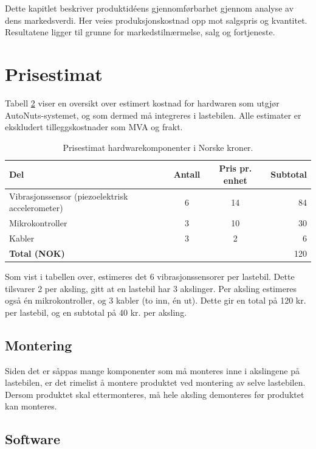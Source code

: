 Dette kapitlet beskriver produktidéens gjennomførbarhet gjennom analyse av 
dens markedsverdi. Her veies produksjonskostnad opp mot salgspris og kvantitet.
Resultatene ligger til grunne for markedstilnærmelse, salg og fortjeneste.

\section{Prisestimat}
Tabell \ref{tab:price-HW} viser en oversikt over estimert kostnad for 
hardwaren som utgjør AutoNuts-systemet, og som dermed må integreres i lastebilen. Alle estimater er ekskludert tilleggskostnader som MVA og frakt.

\begin{table}[H]
\caption{Prisestimat hardwarekomponenter i Norske kroner.}
\newline
\begin{table}[H]
\caption{Prisestimat hardwarekomponenter i Norske kroner.}
\label{tab:price-HW}
\begin{tabularx}{\textwidth}{lcc|r}
	{\bf Del} & {\bf Antall} & {\bf Pris pr. enhet} & {\bf Subtotal}\\
	\hline
	Vibrasjonssensor (piezoelektrisk accelerometer) & 6 & 14 & 84\\
	Mikrokontroller & 3 & 10 & 30\\
	Kabler & 3 & 2 & 6\\
	\hline
	\multicolumn{3}{l}{{\bf Total (NOK)}} &\multicolumn{1}{r}{120}\\
	\hline \hline
\end{tabularx}
\end{table}

Som vist i tabellen over, estimeres det 6 vibrasjonssensorer per lastebil. Dette
tilsvarer 2 per aksling, gitt at en lastebil har 3 akslinger. Per aksling 
estimeres også én mikrokontroller, og 3 kabler (to inn, én ut). Dette gir en 
total på 120 kr. per lastebil, og en subtotal på 40 kr. per aksling.

\subsection{Montering}
Siden det er såppas mange komponenter som må monteres inne i akslingene på 
lastebilen, er det rimelist å montere produktet ved montering av selve 
lastebilen. Dersom produktet skal ettermonteres, må hele aksling demonteres 
før produktet kan monteres. 

\subsection{Software}


\end{table}
